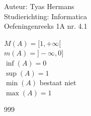 \documentclass[a4paper]{article}
\begin{document}
  
\noindent \large Auteur: Tyas Hermans \\
\noindent \large Studierichting: Informatica\\
\noindent \large Oefeningenreeks 1A nr. 4.1\\

\medskip

\normalsize

$ M(A) = [1,+\infty[$\\

$ m(A) = ]-\infty,0]$\\

$ \inf(A) = 0$\\

$ \sup(A) = 1$\\

$ \min(A)$ bestaat niet\\

$ \max(A) = 1$ \\

\begin{thebibliography}{999}
\end{thebibliography}
\end{document}
